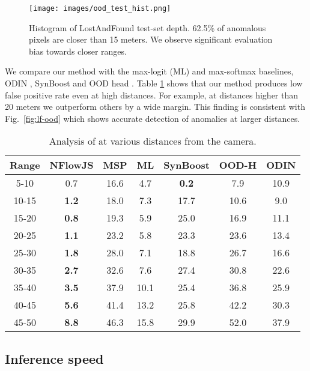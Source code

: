 \documentclass[lettersize,journal,hidelinks]{IEEEtran}
\begin{document}
\begin{figure}[ht]
\centering
\texttt{[image: images/ood\_test\_hist.png]}
\caption{Histogram of LostAndFound test-set depth. 62.5\% of anomalous pixels are closer than 15 meters.
We observe significant evaluation bias towards closer ranges.}
\label{fig:distance}
\end{figure}

We compare our method with the max-logit (ML) and max-softmax \cite{hendrycks17iclr} baselines, ODIN \cite{liang18iclr}, SynBoost \cite{biase21cvpr} and OOD head \cite{bevandic19gcpr}.
Table \ref{tbl:distance_fpr} shows that our method produces low false positive rate even at high distances.
For example, at distances higher than 20 meters we outperform others by a wide margin.
This finding is consistent with Fig.\ \ref{fig:lf-ood} which shows accurate detection of anomalies at larger distances.
\begin{table}[ht]
\caption{Analysis of  at various distances from the camera.
}
\label{tbl:distance_fpr}
\centering
\begin{footnotesize}
\begin{tabular}{c|cccccc}
\hline \hline
Range & NFlowJS & MSP & ML & SynBoost  & OOD-H  & ODIN \\\hline \hline
5-10 & 0.7 & 16.6 & 4.7 & \textbf{0.2} & 7.9 & 10.9 \\
10-15 & \textbf{1.2} & 18.0 & 7.3 & 17.7 & 10.6 & 9.0 \\
15-20 & \textbf{0.8} & 19.3 & 5.9 & 25.0 & 16.9 & 11.1 \\
20-25 & \textbf{1.1} & 23.2 & 5.8 & 23.3 & 23.6 & 13.4 \\
25-30 & \textbf{1.8} & 28.0 & 7.1 & 18.8 & 26.7 & 16.6 \\
30-35 & \textbf{2.7} & 32.6 & 7.6 & 27.4 & 30.8 & 22.6 \\
35-40 & \textbf{3.5} & 37.9 & 10.1 & 25.4 & 36.8 & 25.9 \\
40-45 & \textbf{5.6} & 41.4 & 13.2 & 25.8 & 42.2 & 30.3 \\
45-50 & \textbf{8.8} & 46.3 & 15.8 & 29.9 & 52.0 & 37.9\\
\hline
\end{tabular}
\end{footnotesize}
\end{table}





\subsection{Inference speed}
\end{document}
